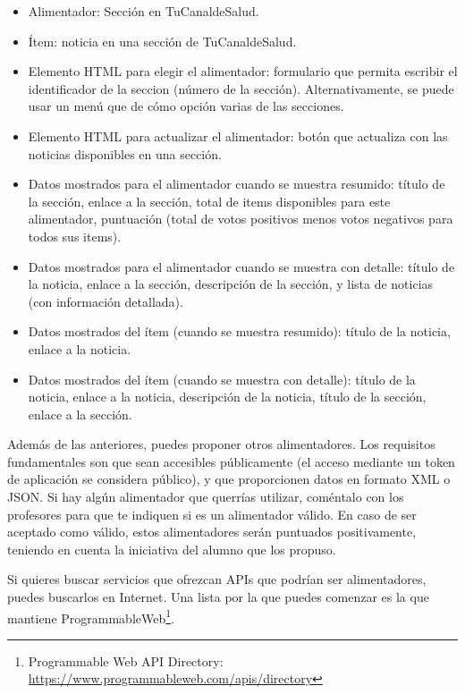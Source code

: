 \begin{itemize}
  \begin{itemize}
  \item Alimentador: Sección en TuCanaldeSalud.
  \item Ítem: noticia en una sección de TuCanaldeSalud.
  \item Elemento HTML para elegir el alimentador: formulario que permita escribir el identificador de la seccion (número de la sección). Alternativamente, se puede usar un menú que de cómo opción varias de las secciones.
  \item Elemento HTML para actualizar el alimentador: botón que actualiza con las noticias disponibles en una sección.
  \item Datos mostrados para el alimentador cuando se muestra resumido: título de la sección, enlace a la sección, total de items disponibles para este alimentador, puntuación (total de votos positivos menos votos negativos para todos sus items).
  \item Datos mostrados para el alimentador cuando se muestra con detalle: título de la noticia, enlace a la sección, descripción de la sección, y lista de noticias (con información detallada).
  \item Datos mostrados del ítem (cuando se muestra resumido): título de la noticia, enlace a la noticia.
  \item Datos mostrados del ítem (cuando se muestra con detalle): título de la noticia, enlace a la noticia, descripción de la noticia, título de la sección, enlace a la sección.
  \end{itemize} 
\end{itemize}

Además de las anteriores, puedes proponer otros alimentadores. Los requisitos fundamentales son que sean accesibles públicamente (el acceso mediante un token de aplicación se considera público), y que proporcionen datos en formato XML o JSON. Si hay algún alimentador que querrías utilizar, coméntalo con los profesores para que te indiquen si es un alimentador válido. En caso de ser aceptado como válido, estos alimentadores serán puntuados positivamente, teniendo en cuenta la iniciativa del alumno que los propuso.

Si quieres buscar servicios que ofrezcan APIs que podrían ser alimentadores, puedes buscarlos en Internet. Una lista por la que puedes comenzar es la que mantiene ProgrammableWeb\footnote{Programmable Web API Directory: \\\url{https://www.programmableweb.com/apis/directory}}.

